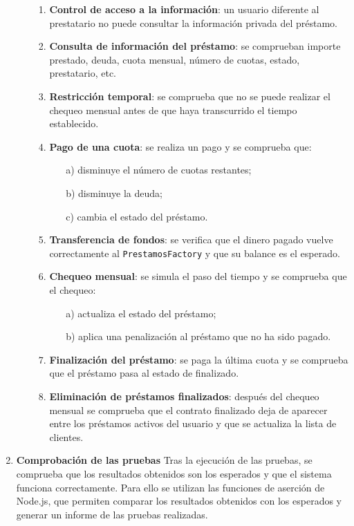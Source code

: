 \begin{enumerate}
\begin{enumerate}
                \begin{enumerate}
                    \item \textbf{Control de acceso a la información}: un usuario diferente al prestatario no puede consultar la información privada del préstamo.
                    \item \textbf{Consulta de información del préstamo}: se comprueban importe prestado, deuda, cuota mensual, número de cuotas, estado, prestatario, etc.
                    \item \textbf{Restricción temporal}: se comprueba que no se puede realizar el chequeo mensual antes de que haya transcurrido el tiempo establecido.
                    \item \textbf{Pago de una cuota}: se realiza un pago y se comprueba que:
                    \begin{enumerate}
                        \item[a)] disminuye el número de cuotas restantes;
                        \item[b)] disminuye la deuda;
                        \item[c)] cambia el estado del préstamo.
                    \end{enumerate}
                    \item \textbf{Transferencia de fondos}: se verifica que el dinero pagado vuelve correctamente al \texttt{PrestamosFactory} y que su balance es el esperado.
                    \item \textbf{Chequeo mensual}: se simula el paso del tiempo y se comprueba que el chequeo:
                    \begin{enumerate}
                        \item[a)] actualiza el estado del préstamo;
                        \item[b)] aplica una penalización al préstamo que no ha sido pagado.
                    \end{enumerate}
                    \item \textbf{Finalización del préstamo}: se paga la última cuota y se comprueba que el préstamo pasa al estado de finalizado.
                    \item \textbf{Eliminación de préstamos finalizados}: después del chequeo mensual se comprueba que el contrato finalizado deja de aparecer entre los préstamos activos del usuario y que se actualiza la lista de clientes.
                \end{enumerate}
            \end{enumerate}

    \item \textbf{Comprobación de las pruebas} Tras la ejecución de las pruebas, se comprueba que los resultados obtenidos son los esperados y que el sistema funciona correctamente.
     Para ello se utilizan las funciones de aserción de Node.js, que permiten comparar los resultados obtenidos con los esperados y generar un informe de las pruebas realizadas.
       \end{enumerate}
    
